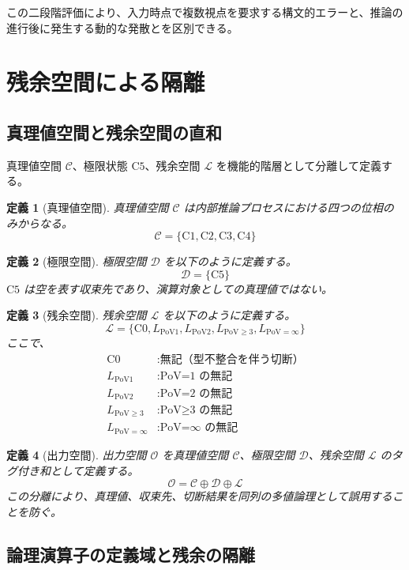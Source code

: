 \documentclass[11pt,a4paper]{article}
\newtheorem{definition}{定義}
\newcommand{\C}{\mathcal{C}}
\newcommand{\Lspace}{\mathcal{L}}
\newcommand{\Ospace}{\mathcal{O}}
\newcommand{\Czero}{\text{C0}}
\newcommand{\Cone}{\text{C1}}
\newcommand{\Ctwo}{\text{C2}}
\newcommand{\Cthree}{\text{C3}}
\newcommand{\Cfour}{\text{C4}}
\newcommand{\Cfive}{\text{C5}}
\newcommand{\Lone}{L_{\text{PoV1}}}
\newcommand{\Ltwo}{L_{\text{PoV2}}}
\newcommand{\Lgeq}{L_{\text{PoV}\geq3}}
\newcommand{\Linfty}{L_{\text{PoV}=\infty}}
\begin{document}
この二段階評価により、入力時点で複数視点を要求する構文的エラーと、推論の進行後に発生する動的な発散とを区別できる。

\section{残余空間による隔離}
\label{sec:residual}

\subsection{真理値空間と残余空間の直和}
\label{subsec:direct-sum}

真理値空間 $\C$、極限状態 $\Cfive$、残余空間 $\Lspace$ を機能的階層として分離して定義する。

\begin{definition}[真理値空間]
真理値空間 $\C$ は内部推論プロセスにおける四つの位相のみからなる。
\[
\C = \{\Cone, \Ctwo, \Cthree, \Cfour\}
\]
\end{definition}

\begin{definition}[極限空間]
極限空間 $\mathcal{D}$ を以下のように定義する。
\[
\mathcal{D} = \{\Cfive\}
\]
$\Cfive$ は空を表す収束先であり、演算対象としての真理値ではない。
\end{definition}

\begin{definition}[残余空間]
残余空間 $\Lspace$ を以下のように定義する。
\[
\Lspace = \{\Czero, \Lone, \Ltwo, \Lgeq, \Linfty\}
\]
ここで、
\begin{align*}
\Czero &: \text{無記（型不整合を伴う切断）} \\
\Lone &: \text{PoV=1 の無記} \\
\Ltwo &: \text{PoV=2 の無記} \\
\Lgeq &: \text{PoV≥3 の無記} \\
\Linfty &: \text{PoV=∞ の無記}
\end{align*}
\end{definition}

\begin{definition}[出力空間]
出力空間 $\Ospace$ を真理値空間 $\C$、極限空間 $\mathcal{D}$、残余空間 $\Lspace$ のタグ付き和として定義する。
\[
\Ospace = \C \oplus \mathcal{D} \oplus \Lspace
\]
この分離により、真理値、収束先、切断結果を同列の多値論理として誤用することを防ぐ。
\end{definition}


\subsection{論理演算子の定義域と残余の隔離}
\label{subsec:type-ops}
\end{document}
